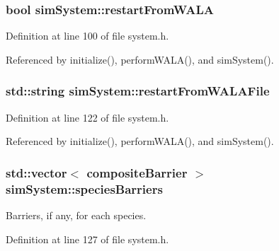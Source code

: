 \hypertarget{classsim_system_a2b168c89742f4d64270583e7e54b2929}{
\subsubsection[{restart\-From\-W\-A\-L\-A}]{\setlength{\rightskip}{0pt plus 5cm}bool sim\-System\-::restart\-From\-W\-A\-L\-A}}\label{classsim_system_a2b168c89742f4d64270583e7e54b2929}


Definition at line 100 of file system.\-h.



Referenced by initialize(), perform\-W\-A\-L\-A(), and sim\-System().

\hypertarget{classsim_system_afbf0b172dc35572e71ec6d27a018e2fc}{
\subsubsection[{restart\-From\-W\-A\-L\-A\-File}]{\setlength{\rightskip}{0pt plus 5cm}std\-::string sim\-System\-::restart\-From\-W\-A\-L\-A\-File}}\label{classsim_system_afbf0b172dc35572e71ec6d27a018e2fc}


Definition at line 122 of file system.\-h.



Referenced by initialize(), perform\-W\-A\-L\-A(), and sim\-System().

\hypertarget{classsim_system_a5ae652ff4519f39c3862abae32a9581b}{
\subsubsection[{species\-Barriers}]{\setlength{\rightskip}{0pt plus 5cm}std\-::vector$<$ {\bf composite\-Barrier} $>$ sim\-System\-::species\-Barriers}}\label{classsim_system_a5ae652ff4519f39c3862abae32a9581b}


Barriers, if any, for each species. 



Definition at line 127 of file system.\-h.



